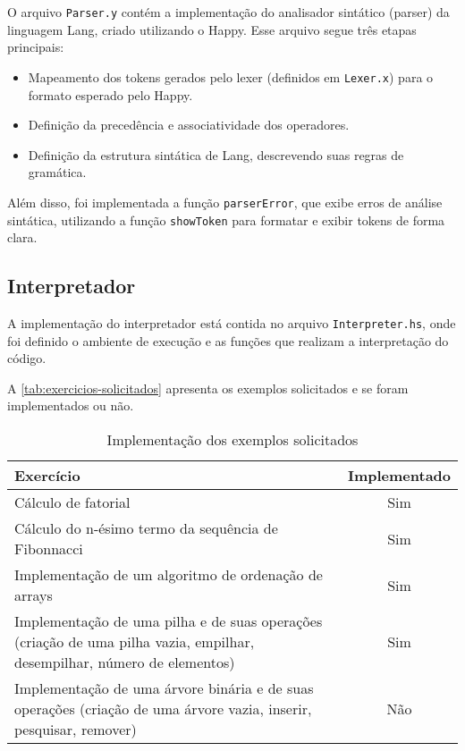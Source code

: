 \documentclass{article}
\begin{document}
O arquivo \texttt{Parser.y} contém a implementação do analisador sintático (parser) da linguagem Lang, criado utilizando o Happy. Esse arquivo segue três etapas principais:

\begin{itemize}
    \item Mapeamento dos tokens gerados pelo lexer (definidos em \texttt{Lexer.x}) para o formato esperado pelo Happy.
    \item Definição da precedência e associatividade dos operadores.
    \item Definição da estrutura sintática de Lang, descrevendo suas regras de gramática.
\end{itemize}

Além disso, foi implementada a função \texttt{parserError}, que exibe erros de análise sintática, utilizando a função \texttt{showToken} para formatar e exibir tokens de forma clara.

\subsection{Interpretador}\label{desenvolvimento:interpreter}

A implementação do interpretador está contida no arquivo \texttt{Interpreter.hs}, onde foi definido o ambiente de execução e as funções que realizam a interpretação do código.

A \autoref{tab:exercicios-solicitados} apresenta os exemplos solicitados e se foram implementados ou não.

\begin{table}[h!]
\centering
\caption{Implementação dos exemplos solicitados}
\label{tab:exercicios-solicitados}
\begin{tabular}{p{5cm}c}
\hline
\textbf{Exercício} & \textbf{Implementado} \\ \hline
Cálculo de fatorial & Sim \\ \hline
Cálculo do n-ésimo termo da sequência de Fibonnacci & Sim \\ \hline
Implementação de um algoritmo de ordenação de arrays & Sim \\ \hline
Implementação de uma pilha e de suas operações (criação de uma pilha vazia, empilhar, desempilhar, número de elementos) & Sim \\ \hline
Implementação de uma árvore binária e de suas operações (criação de uma árvore vazia, inserir, pesquisar, remover) & Não \\ \hline
\end{tabular}
\end{table}
\end{document}
